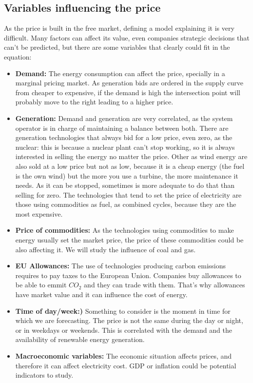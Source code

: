 \subsection{Variables influencing the price}
As the price is built in the free market, defining a model explaining it is very difficult.
Many factors can affect its value, even companies strategic decisions that can't be predicted, but there are some variables that clearly could fit in the equation: \cite{mercado-electrico-periodico-energia, mercado-electrico-cambio-energetico}

\begin{itemize}
    \item \textbf{Demand:} The energy consumption can affect the price, specially in a marginal pricing market. As generation bids are ordered in the supply curve from cheaper to expensive, if the demand is high the intersection point will probably move to the right leading to a higher price.
    \item \textbf{Generation:} Demand and generation are very correlated, as the system operator is in charge of maintaining a balance between both. There are generation technologies that always bid for a low price, even zero, as the nuclear: this is because a nuclear plant can't stop working, so it is always interested in selling the energy no matter the price. Other as wind energy are also sold at a low price but not as low, because it is a cheap energy (the fuel is the own wind) but the more you use a turbine, the more maintenance it needs. As it can be stopped, sometimes is more adequate to do that than selling for zero. The technologies that tend to set the price of electricity are those using commodities as fuel, as combined cycles, because they are the most expensive.
    \item \textbf{Price of commodities:} As the technologies using commodities to make energy usually set the market price, the price of these commodities could be also affecting it. We will study the influence of coal and gas.
    \item \textbf{EU Allowances:} The use of technologies producing carbon emissions requires to pay taxes to the European Union. Companies buy allowances to be able to emmit $CO_2$ and they can trade with them. That's why allowances have market value and it can influence the cost of energy.
    \item \textbf{Time of day/week:)} Something to consider is the moment in time for which we are forecasting. The price is not the same during the day or night, or in weekdays or weekends. This is correlated with the demand and the availability of renewable energy generation.
    \item \textbf{Macroeconomic variables:} The economic situation affects prices, and therefore it can affect electricity cost. GDP or inflation could be potential indicators to study.
\end{itemize}